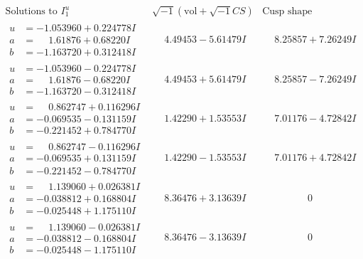 \documentclass[1p]{elsarticle_modified}
\theoremstyle{definition}
\newcommand{\I}{\sqrt{-1}}
\begin{document}
$$\begin{array}{c|c|c}  
\text{Solutions to }I^u_{1}& \I (\text{vol} + \sqrt{-1}CS) & \text{Cusp shape}\\
 \hline 
\begin{aligned}
u &= -1.053960 + 0.224778 I \\
a &= \phantom{-}1.61876 + 0.68220 I \\
b &= -1.163720 + 0.312418 I\end{aligned}
 & \phantom{-}4.49453 - 5.61479 I & \phantom{-}8.25857 + 7.26249 I \\ \hline\begin{aligned}
u &= -1.053960 - 0.224778 I \\
a &= \phantom{-}1.61876 - 0.68220 I \\
b &= -1.163720 - 0.312418 I\end{aligned}
 & \phantom{-}4.49453 + 5.61479 I & \phantom{-}8.25857 - 7.26249 I \\ \hline\begin{aligned}
u &= \phantom{-}0.862747 + 0.116296 I \\
a &= -0.069535 - 0.131159 I \\
b &= -0.221452 + 0.784770 I\end{aligned}
 & \phantom{-}1.42290 + 1.53553 I & \phantom{-}7.01176 - 4.72842 I \\ \hline\begin{aligned}
u &= \phantom{-}0.862747 - 0.116296 I \\
a &= -0.069535 + 0.131159 I \\
b &= -0.221452 - 0.784770 I\end{aligned}
 & \phantom{-}1.42290 - 1.53553 I & \phantom{-}7.01176 + 4.72842 I \\ \hline\begin{aligned}
u &= \phantom{-}1.139060 + 0.026381 I \\
a &= -0.038812 + 0.168804 I \\
b &= -0.025448 + 1.175110 I\end{aligned}
 & \phantom{-}8.36476 + 3.13639 I & \phantom{-0.000000 } 0 \\ \hline\begin{aligned}
u &= \phantom{-}1.139060 - 0.026381 I \\
a &= -0.038812 - 0.168804 I \\
b &= -0.025448 - 1.175110 I\end{aligned}
 & \phantom{-}8.36476 - 3.13639 I & \phantom{-0.000000 } 0 \\ \hline\begin{aligned}

\end{aligned}
\end{array}$$
\end{document}
